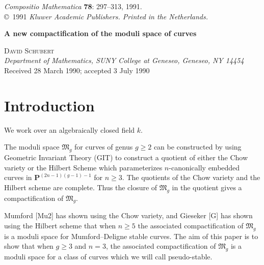 \documentclass[12pt]{memoir}
\begin{document}


\begin{center}
{\itshape Compositio Mathematica} {\bfseries 78}: 297--313, 1991.\\
\copyright\ 1991 {\itshape Kluwer Academic Publishers. Printed in the Netherlands.}
\end{center}

\vspace{1em}

\begin{center}
{\LARGE\bfseries A new compactification of the moduli space of curves}
\end{center}

\vspace{1em}

\begin{flushleft}
{\large\textsc{David Schubert}}\\
{\itshape Department of Mathematics, SUNY College at Geneseo, Geneseo, NY 14454}\\[0.5em]
Received 28 March 1990; accepted 3 July 1990
\end{flushleft}

\vspace{1em}

\section{Introduction}

We work over an algebraically closed field $k$.

The moduli space $\mathfrak{M}_g$ for curves of genus $g \geqslant 2$ can be constructed by using Geometric Invariant Theory (GIT) to construct a quotient of either the Chow variety or the Hilbert Scheme which parameterizes $n$-canonically embedded curves in $\mathbf{P}^{(2n-1)(g-1)-1}$ for $n \geqslant 3$. The quotients of the Chow variety and the Hilbert scheme are complete. Thus the closure of $\mathfrak{M}_g$ in the quotient gives a compactification of $\mathfrak{M}_g$.

Mumford [Mu2] has shown using the Chow variety, and Gieseker [G] has shown using the Hilbert scheme that when $n \geqslant 5$ the associated compactification of $\mathfrak{M}_g$ is a moduli space for Mumford--Deligne stable curves. The aim of this paper is to show that when $g \geqslant 3$ and $n = 3$, the associated compactification of $\mathfrak{M}_g$ is a moduli space for a class of curves which we will call pseudo-stable.
\end{document}
